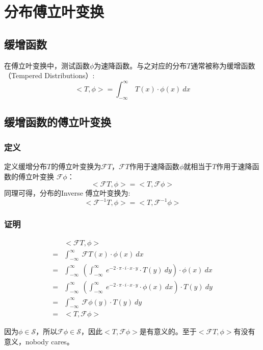 \section{分布傅立叶变换}
\subsection{缓增函数}
在傅立叶变换中，测试函数$\phi$为速降函数。与之对应的分布$T$通常被称为缓增函数（Tempered Distributions）:
$$
	<T,\phi>=\int_{-\infty}^{\infty}\ T(x)\cdot \phi(x)\ dx
$$
\subsection{缓增函数的傅立叶变换}
\subsubsection{定义}
定义缓增分布$T$的傅立叶变换为$\mathcal{F}T$，$\mathcal{F}T$作用于速降函数$\phi$就相当于$T$作用于速降函数的傅立叶变换 $\mathcal{F}\phi$：
\begin{equation}
	<\mathcal{F}T,\phi>=<T,\mathcal{F}\phi>
\end{equation}
同理可得，分布的Inverse 傅立叶变换为:
\begin{equation}
	<\mathcal{F}^{-1}T,\phi>=<T,\mathcal{F}^{-1}\phi>
\end{equation}
\subsubsection{证明}
\begin{align*}
	  & <\mathcal{F}T,\phi>                                                                                                     \\
	= & \int_{-\infty}^{\infty}\ \mathcal{F}T(x)\cdot \phi(x)\ dx                                                               \\
	= & \int_{-\infty}^{\infty}\ (\int_{-\infty}^{\infty}\ e^{-2\cdot \pi\cdot i\cdot x\cdot y}\cdot T(y)\ dy)\cdot \phi(x)\ dx \\
	= & \int_{-\infty}^{\infty}\ (\int_{-\infty}^{\infty}\ e^{-2\cdot \pi\cdot i\cdot x\cdot y}\cdot \phi(x)\ dx)\cdot T(y)\ dy \\
	= & \int_{-\infty}^{\infty}\ \mathcal{F}\phi(y)\cdot T(y)\ dy                                                               \\
	= & <T,\mathcal{F}\phi>
\end{align*}

因为$\phi\in \mathcal  {S}$，所以$\mathcal{F}\phi\in \mathcal  {S}$，因此$<T,\mathcal{F}\phi>$是有意义的。至于$<\mathcal{F}T,\phi>$有没有意义，nobody cares。
